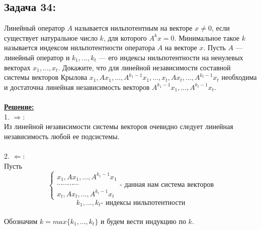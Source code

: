 \documentclass[a4paper,12pt,titlepage,final]{article}
\begin{document}
\subsection*{Задача 34:}
\noindent Линейный оператор $A$ называется нильпотентным на векторе $x \neq 0$, если существует 
натуральное число $k$, для которого $A^k x = 0$. Минимальное такое $k$ называется индексом 
нильпотентности оператора $A$ на векторе $x$. Пусть $A$ — линейный оператор и $k_1, ... , k_t$ — его индексы 
нильпотентности на ненулевых векторах $x_1, ... , x_t$. Докажите, что для линейной независимости составной системы векторов Крылова 
$x_1, Ax_1, ... , A^{k_1 - 1} x_1, ... , x_t , Ax_t, ... , A^{k_t - 1} x_t$ 
необходима и достаточна линейная независимость векторов $A^{k_1 - 1} x_1, ... , A^{k_t - 1} x_t$. \\ \\
\textbf{\underline{Решение:}} \\
1. $\Rightarrow$: \\
Из линейной независимости системы векторов очевидно следует линейная независимость любой ее подсистемы. \\ \\
2. $\Leftarrow$: \\
Пусть 
$$
\begin{cases}
    x_1, Ax_1, ... , A^{k_1 - 1} x_1 \\
    \cdots \cdots \cdots \cdots \\
    x_t , Ax_t, ... , A^{k_t - 1} x_t
\end{cases}
\text{- данная нам система векторов}$$ $$k_1, ... , k_t \text{- индексы нильпотентности}$$ \\
Обозначим $k = max\{k_1, ... , k_t\}$ и будем вести индукцию по $k$.
\end{document}
